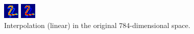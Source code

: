 \documentclass{article}
\begin{document}
\begin{figure}[h]
\begin{minipage}{.09\textwidth}
		\end{minipage}
		\begin{minipage}{.09\textwidth}
			\centering
			\includegraphics[width=\linewidth, scale=0.2]{Python/interp_orig/im_8.png}
		\end{minipage}
		\begin{minipage}{.09\textwidth}
			\centering
			\includegraphics[width=\linewidth, scale=0.2]{Python/interp_orig/im_9.png}
		\end{minipage}
		\caption{Interpolation (linear) in the original 784-dimensional space.}
	\end{figure}
\end{document}
